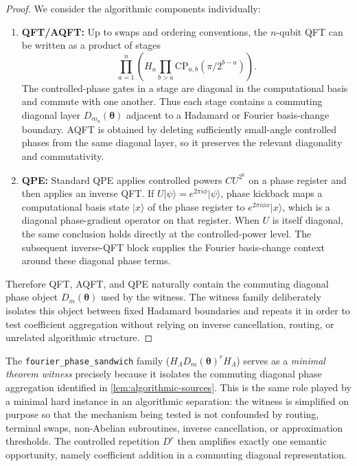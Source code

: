 \documentclass[11pt]{article}
\begin{document}
\begin{proof}
We consider the algorithmic components individually:
\begin{enumerate}[leftmargin=1.5em]
    \item \textbf{QFT/AQFT:} Up to swaps and ordering conventions, the $n$-qubit QFT can be written as a product of stages
    \[
    \prod_{a=1}^{n}
    \left(
    H_a
    \prod_{b>a} \mathrm{CP}_{a,b}(\pi/2^{b-a})
    \right).
    \]
    The controlled-phase gates in a stage are diagonal in the computational
    basis and commute with one another. Thus each stage contains a commuting
    diagonal layer $D_{m_a}(\boldsymbol{\theta})$ adjacent to a Hadamard or
    Fourier basis-change boundary. AQFT is obtained by deleting sufficiently
    small-angle controlled phases from the same diagonal layer, so it preserves
    the relevant diagonality and commutativity.
    \item \textbf{QPE:} Standard QPE applies controlled powers $CU^{2^k}$ on a
    phase register and then applies an inverse QFT. If
    $U\lvert\psi\rangle=e^{2\pi i\phi}\lvert\psi\rangle$, phase kickback maps
    a computational basis state $\lvert x\rangle$ of the phase register to
    $e^{2\pi i\phi x}\lvert x\rangle$, which is a diagonal phase-gradient
    operator on that register. When $U$ is itself
    diagonal, the same conclusion holds directly at the controlled-power
    level. The subsequent inverse-QFT block supplies the Fourier basis-change
    context around these diagonal phase terms.
\end{enumerate}
Therefore QFT, AQFT, and QPE naturally contain the commuting diagonal phase
object $D_m(\boldsymbol{\theta})$ used by the witness. The witness family
deliberately isolates this object between fixed Hadamard boundaries and repeats
it in order to test coefficient aggregation without relying on inverse
cancellation, routing, or unrelated algorithmic structure.
\end{proof}

The \texttt{fourier\_phase\_sandwich} family
($H_{\Lambda}D_m(\boldsymbol{\theta})^rH_{\Lambda}$) serves as a
\emph{minimal theorem witness} precisely because it isolates the commuting
diagonal phase aggregation identified in \cref{lem:algorithmic-sources}. This
is the same role played by a minimal hard instance in an algorithmic separation:
the witness is simplified on purpose so that the mechanism being tested is not
confounded by routing, terminal swaps, non-Abelian subroutines, inverse
cancellation, or approximation thresholds. The controlled repetition $D^r$
then amplifies exactly one semantic opportunity, namely coefficient addition in
a commuting diagonal representation.
\end{document}
